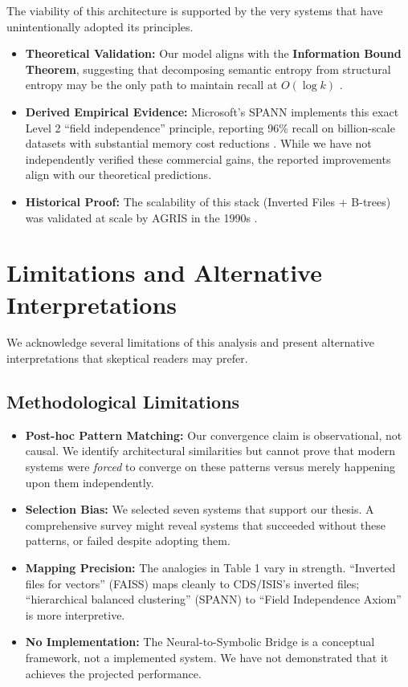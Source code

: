 \documentclass[manuscript,screen,nonacm]{acmart}
\begin{document}
The viability of this architecture is supported by the very systems that have unintentionally adopted its principles.
\begin{itemize}
    \item \textbf{Theoretical Validation:} Our model aligns with the \textbf{Information Bound Theorem}, suggesting that decomposing semantic entropy from structural entropy may be the only path to maintain recall at $O(\log k)$ \cite{korten2025}.
    \item \textbf{Derived Empirical Evidence:} Microsoft's SPANN implements this exact Level 2 ``field independence'' principle, reporting 96\% recall on billion-scale datasets with substantial memory cost reductions \cite{chen2021}. While we have not independently verified these commercial gains, the reported improvements align with our theoretical predictions.
    \item \textbf{Historical Proof:} The scalability of this stack (Inverted Files + B-trees) was validated at scale by AGRIS in the 1990s \cite{fao2005}.
\end{itemize}

\section{Limitations and Alternative Interpretations}

We acknowledge several limitations of this analysis and present alternative interpretations that skeptical readers may prefer.

\subsection{Methodological Limitations}

\begin{itemize}
    \item \textbf{Post-hoc Pattern Matching:} Our convergence claim is observational, not causal. We identify architectural similarities but cannot prove that modern systems were \textit{forced} to converge on these patterns versus merely happening upon them independently.

    \item \textbf{Selection Bias:} We selected seven systems that support our thesis. A comprehensive survey might reveal systems that succeeded without these patterns, or failed despite adopting them.

    \item \textbf{Mapping Precision:} The analogies in Table 1 vary in strength. ``Inverted files for vectors'' (FAISS) maps cleanly to CDS/ISIS's inverted files; ``hierarchical balanced clustering'' (SPANN) to ``Field Independence Axiom'' is more interpretive.

    \item \textbf{No Implementation:} The Neural-to-Symbolic Bridge is a conceptual framework, not a implemented system. We have not demonstrated that it achieves the projected performance.
\end{itemize}
\end{document}
